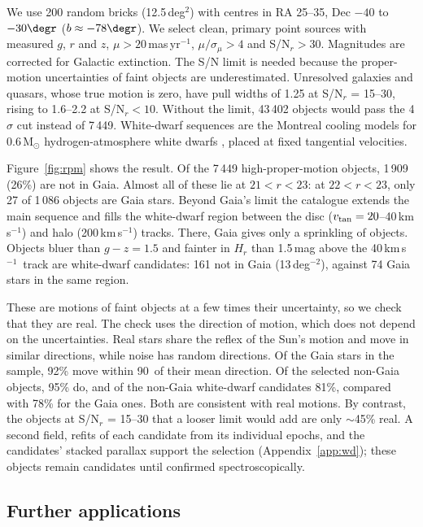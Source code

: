 \documentclass[usenatbib]{mnras}   %
\newcommand{\kms}{\,km\,s$^{-1}$} %
\begin{document}
We use 200 random bricks (12.5\,deg$^2$) with centres in RA 25--35\degr, Dec $-40$ to $-30\degr$ ($b \approx -78\degr$). We select clean, primary point sources with measured $g$, $r$ and $z$, $\mu > 20$\,mas\,yr$^{-1}$, $\mu/\sigma_\mu > 4$ and S/N$_r > 30$. Magnitudes are corrected for Galactic extinction. The S/N limit is needed because the proper-motion uncertainties of faint objects are underestimated. Unresolved galaxies and quasars, whose true motion is zero, have pull widths of 1.25 at S/N$_r$ = 15--30, rising to 1.6--2.2 at S/N$_r < 10$. Without the limit, 43\,402 objects would pass the 4$\sigma$ cut instead of 7\,449. White-dwarf sequences are the Montreal cooling models for 0.6\,M$_\odot$ hydrogen-atmosphere white dwarfs \citep{Bergeron1995, Bedard2020}, placed at fixed tangential velocities.

Figure~\ref{fig:rpm} shows the result. Of the 7\,449 high-proper-motion objects, 1\,909 (26\%) are not in Gaia. Almost all of these lie at $21 < r < 23$: at $22 < r < 23$, only 27 of 1\,086 objects are Gaia stars. Beyond Gaia's limit the catalogue extends the main sequence and fills the white-dwarf region between the disc ($v_{\rm tan} = 20$--40\kms) and halo (200\kms) tracks. There, Gaia gives only a sprinkling of objects. Objects bluer than $g - z = 1.5$ and fainter in $H_r$ than 1.5\,mag above the 40\kms\ track are white-dwarf candidates: 161 not in Gaia (13\,deg$^{-2}$), against 74 Gaia stars in the same region.

These are motions of faint objects at a few times their uncertainty, so we check that they are real. The check uses the direction of motion, which does not depend on the uncertainties. Real stars share the reflex of the Sun's motion and move in similar directions, while noise has random directions. Of the Gaia stars in the sample, 92\% move within 90\degr\ of their mean direction. Of the selected non-Gaia objects, 95\% do, and of the non-Gaia white-dwarf candidates 81\%, compared with 78\% for the Gaia ones. Both are consistent with real motions. By contrast, the objects at S/N$_r$ = 15--30 that a looser limit would add are only $\sim$45\% real. A second field, refits of each candidate from its individual epochs, and the candidates' stacked parallax support the selection (Appendix~\ref{app:wd}); these objects remain candidates until confirmed spectroscopically. 

\subsection{Further applications} \label{sec:applications_next}
\end{document}
